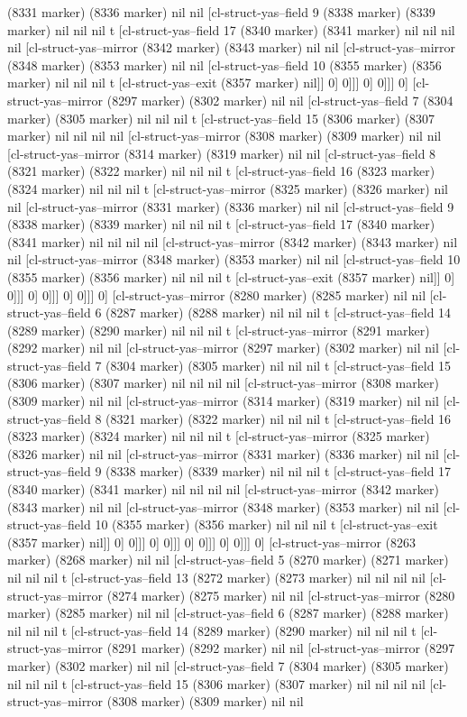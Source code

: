 {{(8331 marker) (8336 marker) nil nil [cl-struct-yas--field 9 (8338 marker) (8339 marker) nil nil nil t [cl-struct-yas--field 17 (8340 marker) (8341 marker) nil nil nil nil [cl-struct-yas--mirror (8342 marker) (8343 marker) nil nil [cl-struct-yas--mirror (8348 marker) (8353 marker) nil nil [cl-struct-yas--field 10 (8355 marker) (8356 marker) nil nil nil t [cl-struct-yas--exit (8357 marker) nil]] 0] 0]]] 0] 0]]] 0] [cl-struct-yas--mirror (8297 marker) (8302 marker) nil nil [cl-struct-yas--field 7 (8304 marker) (8305 marker) nil nil nil t [cl-struct-yas--field 15 (8306 marker) (8307 marker) nil nil nil nil [cl-struct-yas--mirror (8308 marker) (8309 marker) nil nil [cl-struct-yas--mirror (8314 marker) (8319 marker) nil nil [cl-struct-yas--field 8 (8321 marker) (8322 marker) nil nil nil t [cl-struct-yas--field 16 (8323 marker) (8324 marker) nil nil nil t [cl-struct-yas--mirror (8325 marker) (8326 marker) nil nil [cl-struct-yas--mirror (8331 marker) (8336 marker) nil nil [cl-struct-yas--field 9 (8338 marker) (8339 marker) nil nil nil t [cl-struct-yas--field 17 (8340 marker) (8341 marker) nil nil nil nil [cl-struct-yas--mirror (8342 marker) (8343 marker) nil nil [cl-struct-yas--mirror (8348 marker) (8353 marker) nil nil [cl-struct-yas--field 10 (8355 marker) (8356 marker) nil nil nil t [cl-struct-yas--exit (8357 marker) nil]] 0] 0]]] 0] 0]]] 0] 0]]] 0] [cl-struct-yas--mirror (8280 marker) (8285 marker) nil nil [cl-struct-yas--field 6 (8287 marker) (8288 marker) nil nil nil t [cl-struct-yas--field 14 (8289 marker) (8290 marker) nil nil nil t [cl-struct-yas--mirror (8291 marker) (8292 marker) nil nil [cl-struct-yas--mirror (8297 marker) (8302 marker) nil nil [cl-struct-yas--field 7 (8304 marker) (8305 marker) nil nil nil t [cl-struct-yas--field 15 (8306 marker) (8307 marker) nil nil nil nil [cl-struct-yas--mirror (8308 marker) (8309 marker) nil nil [cl-struct-yas--mirror (8314 marker) (8319 marker) nil nil [cl-struct-yas--field 8 (8321 marker) (8322 marker) nil nil nil t [cl-struct-yas--field 16 (8323 marker) (8324 marker) nil nil nil t [cl-struct-yas--mirror (8325 marker) (8326 marker) nil nil [cl-struct-yas--mirror (8331 marker) (8336 marker) nil nil [cl-struct-yas--field 9 (8338 marker) (8339 marker) nil nil nil t [cl-struct-yas--field 17 (8340 marker) (8341 marker) nil nil nil nil [cl-struct-yas--mirror (8342 marker) (8343 marker) nil nil [cl-struct-yas--mirror (8348 marker) (8353 marker) nil nil [cl-struct-yas--field 10 (8355 marker) (8356 marker) nil nil nil t [cl-struct-yas--exit (8357 marker) nil]] 0] 0]]] 0] 0]]] 0] 0]]] 0] 0]]] 0] [cl-struct-yas--mirror (8263 marker) (8268 marker) nil nil [cl-struct-yas--field 5 (8270 marker) (8271 marker) nil nil nil t [cl-struct-yas--field 13 (8272 marker) (8273 marker) nil nil nil nil [cl-struct-yas--mirror (8274 marker) (8275 marker) nil nil [cl-struct-yas--mirror (8280 marker) (8285 marker) nil nil [cl-struct-yas--field 6 (8287 marker) (8288 marker) nil nil nil t [cl-struct-yas--field 14 (8289 marker) (8290 marker) nil nil nil t [cl-struct-yas--mirror (8291 marker) (8292 marker) nil nil [cl-struct-yas--mirror (8297 marker) (8302 marker) nil nil [cl-struct-yas--field 7 (8304 marker) (8305 marker) nil nil nil t [cl-struct-yas--field 15 (8306 marker) (8307 marker) nil nil nil nil [cl-struct-yas--mirror (8308 marker) (8309 marker) nil nil }}
